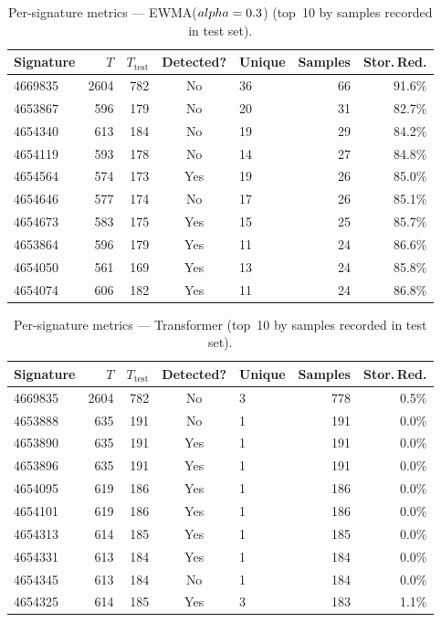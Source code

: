 \documentclass[11pt,a4paper]{article}
\begin{document}
\begin{table}[H]
\centering
\caption{Per-signature metrics --- EWMA($\\alpha=0.3$) (top~10 by samples recorded in test set).}
\label{tab:ewma_persig}
\begin{tabular}{lrrclrr}
\toprule
Signature & $T$ & $T_{\mathrm{test}}$ & Detected? & Unique & Samples & Stor.\,Red. \\
\midrule
  4669835 & 2604 & 782 & No & 36 & 66 & 91.6\% \\
  4653867 & 596 & 179 & No & 20 & 31 & 82.7\% \\
  4654340 & 613 & 184 & No & 19 & 29 & 84.2\% \\
  4654119 & 593 & 178 & No & 14 & 27 & 84.8\% \\
  4654564 & 574 & 173 & Yes & 19 & 26 & 85.0\% \\
  4654646 & 577 & 174 & No & 17 & 26 & 85.1\% \\
  4654673 & 583 & 175 & Yes & 15 & 25 & 85.7\% \\
  4653864 & 596 & 179 & Yes & 11 & 24 & 86.6\% \\
  4654050 & 561 & 169 & Yes & 13 & 24 & 85.8\% \\
  4654074 & 606 & 182 & Yes & 11 & 24 & 86.8\% \\
\bottomrule
\end{tabular}
\end{table}


\begin{table}[H]
\centering
\caption{Per-signature metrics --- Transformer (top~10 by samples recorded in test set).}
\label{tab:transformer_persig}
\begin{tabular}{lrrclrr}
\toprule
Signature & $T$ & $T_{\mathrm{test}}$ & Detected? & Unique & Samples & Stor.\,Red. \\
\midrule
  4669835 & 2604 & 782 & No & 3 & 778 & 0.5\% \\
  4653888 & 635 & 191 & No & 1 & 191 & 0.0\% \\
  4653890 & 635 & 191 & Yes & 1 & 191 & 0.0\% \\
  4653896 & 635 & 191 & Yes & 1 & 191 & 0.0\% \\
  4654095 & 619 & 186 & Yes & 1 & 186 & 0.0\% \\
  4654101 & 619 & 186 & Yes & 1 & 186 & 0.0\% \\
  4654313 & 614 & 185 & Yes & 1 & 185 & 0.0\% \\
  4654331 & 613 & 184 & Yes & 1 & 184 & 0.0\% \\
  4654345 & 613 & 184 & No & 1 & 184 & 0.0\% \\
  4654325 & 614 & 185 & Yes & 3 & 183 & 1.1\% \\
\bottomrule
\end{tabular}
\end{table}
\end{document}
